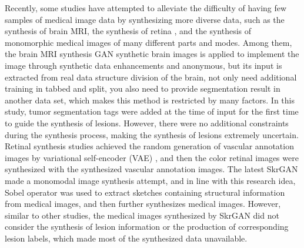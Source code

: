 \documentclass[runningheads]{llncs}
\begin{document}
Recently, some studies have attempted to alleviate the difficulty of having few samples of medical image data by synthesizing more diverse data, such as the synthesis of brain MRI\cite{4shin2018medical}, the synthesis of retina \cite{41costa2017towards}, and the synthesis of monomorphic medical images of many different parts and modes\cite{96zhang2019skrgan:}. Among them, the brain MRI synthesis \cite{4shin2018medical} GAN synthetic brain images is applied to implement the image through synthetic data enhancements and anonymous, but its input is extracted from real data structure division of the brain, not only need additional training in tabbed and split, you also need to provide segmentation result in another data set, which makes this method is restricted by many factors. In this study, tumor segmentation tags were added at the time of input for the first time to guide the synthesis of lesions. However, there were no additional constraints during the synthesis process, making the synthesis of lesions extremely uncertain. Retinal synthesis studies\cite{41costa2017towards} achieved the random generation of vascular annotation images by variational self-encoder (VAE) \cite{87kingma2014auto-encoding,88rezende2014stochastic}, and then the color retinal images were synthesized with the synthesized vascular annotation images. The latest SkrGAN\cite{96zhang2019skrgan:} made a monomodal image synthesis attempt, and in line with this research idea, Sobel operator was used to extract sketches containing structural information from medical images, and then further synthesizes medical images. However, similar to other studies, the medical images synthesized by SkrGAN did not consider the synthesis of lesion information or the production of corresponding lesion labels, which made most of the synthesized data unavailable.
\end{document}
